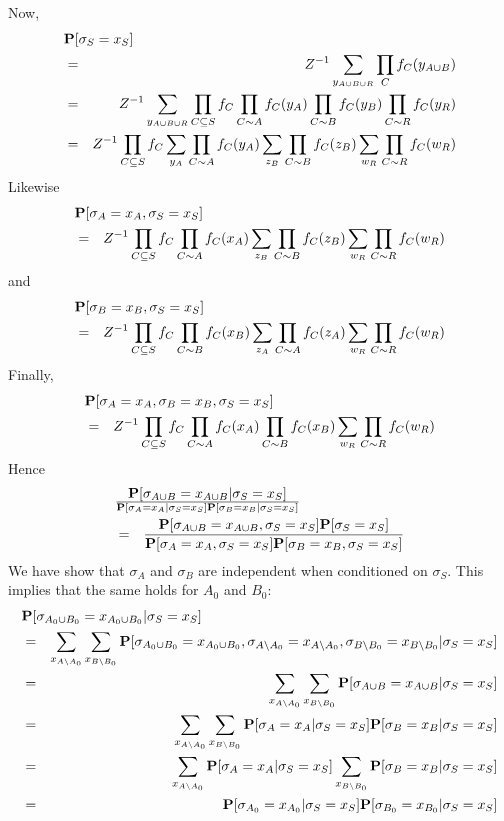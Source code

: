 \documentclass[11pt]{article} \usepackage{amssymb}
\begin{document}
Now,
\begin{eqnarray*}
  \lefteqn{\P[\sigma_S=x_S]}
\\ &=& Z^{-1}\sum_{y_{A\cup B\cup R}}\prod_Cf_C(y_{A\cup B})
\\ &=& Z^{-1}\sum_{y_{A\cup B\cup R}}\prod_{C\subseteq S}f_C\prod_{C\sim A}f_C(y_A)\prod_{C\sim B}f_C(y_B)\prod_{C\sim R}f_C(y_R)
\\ &=& Z^{-1}\prod_{C\subseteq S}f_C\sum_{y_A}\prod_{C\sim A}f_C(y_A)\sum_{z_B}\prod_{C\sim B}f_C(z_B)\sum_{w_R}\prod_{C\sim R}f_C(w_R)
\end{eqnarray*}
Likewise
\begin{eqnarray*}
  \lefteqn{\P[\sigma_A=x_A,\sigma_S=x_S]}
\\ &=& Z^{-1}\prod_{C\subseteq S}f_C\prod_{C\sim A}f_C(x_A)\sum_{z_B}\prod_{C\sim B}f_C(z_B)\sum_{w_R}\prod_{C\sim R}f_C(w_R)
\end{eqnarray*}
and
\begin{eqnarray*}
  \lefteqn{\P[\sigma_B=x_B,\sigma_S=x_S]}
\\ &=& Z^{-1}\prod_{C\subseteq S}f_C\prod_{C\sim B}f_C(x_B)\sum_{z_A}\prod_{C\sim A}f_C(z_A)\sum_{w_R}\prod_{C\sim R}f_C(w_R)
\end{eqnarray*}
Finally,
\begin{eqnarray*}
  \lefteqn{\P[\sigma_A=x_A,\sigma_B=x_B,\sigma_S=x_S]}
\\ &=& Z^{-1}\prod_{C\subseteq S}f_C\prod_{C\sim A}f_C(x_A)\prod_{C\sim B}f_C(x_B)\sum_{w_R}\prod_{C\sim R}f_C(w_R)
\end{eqnarray*}
Hence
\begin{eqnarray*}
\lefteqn{\P[\sigma_{A\cup B}=x_{A\cup B}|\sigma_S=x_S]\over  
    \P[\sigma_A=x_A|\sigma_S=x_S]\P[\sigma_B=x_B|\sigma_S=x_S]}
\\  &=&   {\P[\sigma_{A\cup B}=x_{A\cup B},\sigma_S=x_S]\P[\sigma_S=x_S]\over  
    \P[\sigma_A=x_A,\sigma_S=x_S]\P[\sigma_B=x_B,\sigma_S=x_S]}
\end{eqnarray*}
We have show that $\sigma_A$ and $\sigma_B$ are independent when conditioned
on $\sigma_S$. This implies that the same holds for $A_0$ and $B_0$:
\begin{eqnarray*}
\lefteqn{\P[\sigma_{A_0\cup B_0}=x_{A_0\cup B_0}|\sigma_S=x_S]}
\\ &=& 
\sum_{x_{A\setminus A_0}}\sum_{x_{B\setminus B_0}}\P[\sigma_{A_0\cup B_0}=x_{A_0\cup B_0},\sigma_{A\setminus A_0}=x_{A\setminus A_0},\sigma_{B\setminus B_0}=x_{B\setminus B_0}|\sigma_S=x_S]
\\ &=& \sum_{x_{A\setminus A_0}}\sum_{x_{B\setminus B_0}}\P[\sigma_{A\cup B}=x_{A\cup B}|\sigma_S=x_S]
\\ &=& \sum_{x_{A\setminus A_0}}\sum_{x_{B\setminus B_0}}\P[\sigma_A=x_A|\sigma_S=x_S]\P[\sigma_B=x_B|\sigma_S=x_S]
\\ &=& \sum_{x_{A\setminus A_0}}\P[\sigma_A=x_A|\sigma_S=x_S]\sum_{x_{B\setminus B_0}}\P[\sigma_B=x_B|\sigma_S=x_S]
\\ &=& \P[\sigma_{A_0}=x_{A_0}|\sigma_S=x_S]\P[\sigma_{B_0}=x_{B_0}|\sigma_S=x_S]
\end{eqnarray*}
\end{document}
